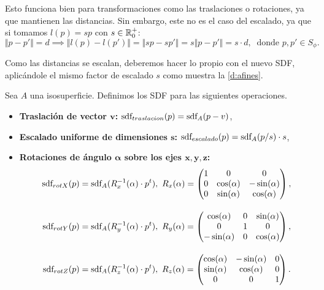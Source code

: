 Esto funciona bien para transformaciones como las traslaciones o rotaciones, ya que mantienen las distancias. Sin embargo, este no es el caso del escalado, ya que si tomamos $l(p) = sp$ con $s\in \mathbb{R}^+_0$:
\begin{equation*}
    \Vert p-p'\Vert = d \implies  \Vert l(p)-l(p')\Vert = \Vert sp-sp'\Vert = s\Vert p-p'\Vert = s\cdot d,\  \text{ donde } p,p' \in S_{\phi}.
\end{equation*}

Como las distancias se escalan, deberemos hacer lo propio con el nuevo SDF, aplicándole el mismo factor de escalado $s$ como muestra la \autoref{d:afines}.

\begin{definicion}\label{d:afines}
    Sea $A$ una isosuperficie. Definimos los SDF para las siguientes operaciones.
    \begin{itemize}
        \item \textbf{Traslación de vector $\boldsymbol{v}$: } $\text{sdf}_{traslacion}(p) = \text{sdf}_{A}(p - v)$,
        \item \textbf{Escalado uniforme de dimensiones $\boldsymbol{s}$: } $\text{sdf}_{escalado}(p) = \text{sdf}_{A}(p/s)\cdot s$,
        \item \textbf{Rotaciones de ángulo $\boldsymbol{\alpha}$ sobre los ejes $\boldsymbol{x,y,z}$: }
        \begin{align*}
            \sdf_{rotX}(p) &= \sdf_{A}(R_x^{-1}(\alpha)\cdot p^t),\ R_x(\alpha) = 
            \begin{pmatrix}
                1&0&0\\
                0&\cos(\alpha) & -\sin(\alpha) \\
                0&\sin(\alpha) & \cos(\alpha) 
                \end{pmatrix},\\[10pt] 
            \sdf_{rotY}(p) &= \sdf_{A}(R_y^{-1}(\alpha)\cdot p^t),\ R_y(\alpha) = \begin{pmatrix}
            \cos(\alpha) &0& \sin(\alpha)\\
            0&1&0\\
            -\sin(\alpha) &0& \cos(\alpha) 
            \end{pmatrix},\\[10pt]
            \sdf_{rotZ}(p) &= \sdf_{A}(R_z^{-1}(\alpha)\cdot p^t),\ R_z(\alpha) = \begin{pmatrix}
            \cos(\alpha) & -\sin(\alpha) & 0\\
            \sin(\alpha) & \cos(\alpha) & 0\\
            0&0&1
            \end{pmatrix}.
        \end{align*}
        
    \end{itemize}
\end{definicion}

